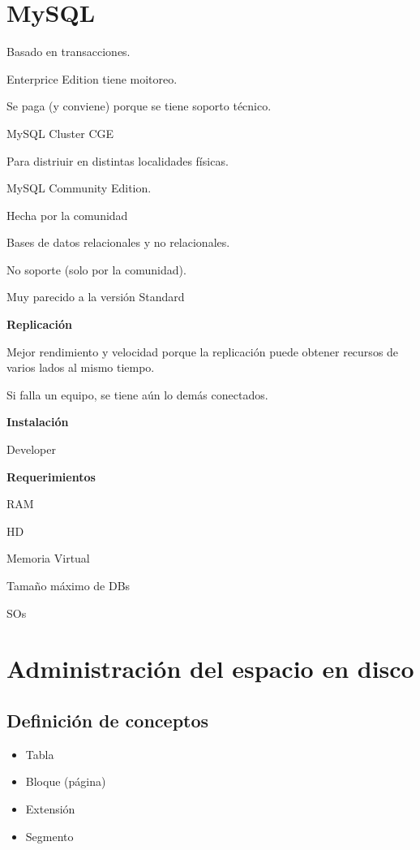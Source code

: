 \documentclass{article}
\begin{document}
\noindent\makebox[\linewidth]{\rule{\paperwidth}{2.0pt}}

\section{MySQL}

Basado en transacciones.

Enterprice Edition tiene moitoreo.

Se paga (y conviene) porque se tiene soporto técnico.

MySQL Cluster CGE

Para distriuir en distintas localidades físicas.

MySQL Community Edition.

Hecha por la comunidad

Bases de datos relacionales y no relacionales.

No soporte (solo por la comunidad).

Muy parecido a la versión Standard

\vspace{1em}
\textbf{Replicación}

Mejor rendimiento y velocidad porque la replicación puede obtener recursos de
varios lados al mismo tiempo.

Si falla un equipo, se tiene aún lo demás conectados.

\vspace{1em}
\textbf{Instalación}

Developer

\vspace{1em}
\textbf{Requerimientos}

RAM

HD

Memoria Virtual

Tamaño máximo de DBs

SOs

\section{Administración del espacio en disco}

\subsection{Definición de conceptos}

\begin{itemize}
	\item
		Tabla
	\item
		Bloque (página)
	\item
		Extensión
	\item
		Segmento
\end{itemize}
\end{document}

